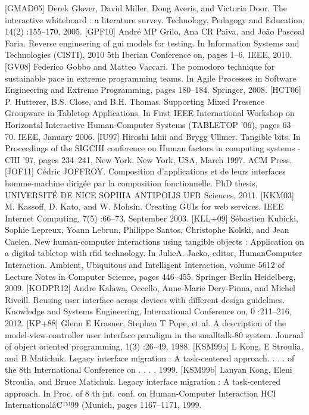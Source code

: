 \documentclass{article}
\begin{document}
[GMAD05]
Derek Glover, David Miller, Doug Averis, and Victoria Door. The interactive whiteboard : a literature survey. Technology, Pedagogy and Education, 14(2) :155–170,
2005.
[GPF10]
Andr\'{e} MP Grilo, Ana CR Paiva, and João Pascoal Faria. Reverse engineering of gui
models for testing. In Information Systems and Technologies (CISTI), 2010 5th Iberian
Conference on, pages 1–6. IEEE, 2010.
[GV08]
Federico Gobbo and Matteo Vaccari. The pomodoro technique for sustainable pace in
extreme programming teams. In Agile Processes in Software Engineering and Extreme
Programming, pages 180–184. Springer, 2008.
[HCT06]
P. Hutterer, B.S. Close, and B.H. Thomas. Supporting Mixed Presence Groupware in
Tabletop Applications. In First IEEE International Workshop on Horizontal Interactive
Human-Computer Systems (TABLETOP ’06), pages 63–70. IEEE, January 2006.
[IU97]
Hiroshi Ishii and Brygg Ullmer. Tangible bits. In Proceedings of the SIGCHI conference on Human factors in computing systems - CHI ’97, pages 234–241, New York,
New York, USA, March 1997. ACM Press.
[JOF11]
C\'{e}dric JOFFROY. Composition d’applications et de leurs interfaces homme-machine
dirig\'{e}e par la composition fonctionnelle. PhD thesis, UNIVERSITÉ DE NICE SOPHIA ANTIPOLIS UFR Sciences, 2011.
[KKM03]
M. Kassoff, D. Kato, and W. Mohsin. Creating GUIs for web services. IEEE Internet
Computing, 7(5) :66–73, September 2003.
[KLL+09]
S\'{e}bastien Kubicki, Sophie Lepreux, Yoann Lebrun, Philippe Santos, Christophe
Kolski, and Jean Caelen. New human-computer interactions using tangible objects :
Application on a digital tabletop with rﬁd technology. In JulieA. Jacko, editor, HumanComputer Interaction. Ambient, Ubiquitous and Intelligent Interaction, volume 5612
of Lecture Notes in Computer Science, pages 446–455. Springer Berlin Heidelberg,
2009.
[KODPR12]
Andre Kalawa, Occello, Anne-Marie Dery-Pinna, and Michel Riveill. Reusing user
interface across devices with different design guidelines. Knowledge and Systems Engineering, International Conference on, 0 :211–216, 2012.
[KP+88]
Glenn E Krasner, Stephen T Pope, et al. A description of the model-view-controller
user interface paradigm in the smalltalk-80 system. Journal of object oriented programming, 1(3) :26–49, 1988.
[KSM99a]
L Kong, E Stroulia, and B Matichuk. Legacy interface migration : A task-centered
approach. . . . of the 8th International Conference on . . . , 1999.
[KSM99b]
Lanyan Kong, Eleni Stroulia, and Bruce Matichuk. Legacy interface migration : A
task-centered approach. In Proc. of 8 th int. conf. on Human-Computer Interaction
HCI International\^{a}C™99 (Munich, pages 1167–1171, 1999.
\end{document}
